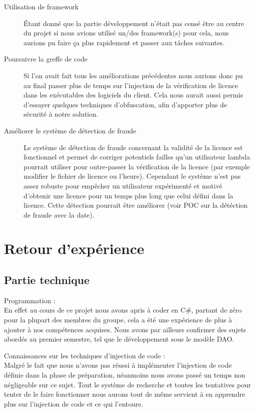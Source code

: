 \begin{description}
    \item[Utilisation de framework]
        Étant donné que la partie développement n'était pas censé être au centre du projet si nous avions utilisé un/des
        framework(s) pour cela, nous aurions pu faire ça plus rapidement et passer aux tâches suivantes.
    \item[Poursuivre la greffe de code]
        Si l'on avait fait tous les améliorations précédentes nous aurions donc pu au final passer plus de temps sur 
        l'injection de la vérification de licence dans les exécutables des logiciels du client. Cela nous aurait aussi
        permis d'essayer quelques techniques d'obfuscation, afin d'apporter plus de sécurité à notre solution.
    \item[Améliorer le système de détection de fraude]
        Le système de détection de fraude concernant la validité de la licence est fonctionnel et permet de corriger
        potentiels failles qu'un utilisateur lambda pourrait utiliser pour outre-passer la vérification de la licence
        (par exemple modifier le fichier de licence ou l'heure). Cependant le système n'est pas assez robuste pour
        empêcher un utilisateur expérimenté et motivé d'obtenir une licence pour un temps plus long que celui défini
        dans la licence. Cette détection pourrait être améliorer (voir POC sur la détéction de fraude avec la date).
\end{description}

\chapter{Retour d'expérience}

\section{Partie technique}
    Programmation :\\
    \newline
    En effet au cours de ce projet nous avons apris à coder en C\#, partant de zéro pour la plupart des membres du groupe, 
    cela a été une expérience de plus à ajouter à nos compétences acquises. Nous avons par ailleurs confirmer des sujets abordés 
    au premier semestre, tel que le développement sous le modèle DAO.
    \newline

     Connaissances sur les techniques d'injection de code :\\
    \newline
    Malgré le fait que nous n'avons pas réussi à implémenter l'injection de code définie dans la phase de préparation, 
    néanmoins nous avons passé un temps non négligeable sur ce sujet. Tout le système de recherche et toutes les tentatives pour 
    tenter de le faire fonctionner nous aurons tout de même servient à en apprendre plus sur l'injection de code et ce qui l'entoure.
    \newline

